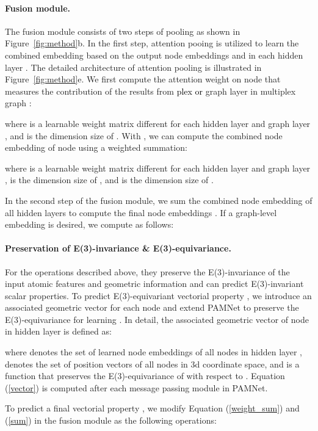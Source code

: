 \documentclass[fleqn,10pt]{wlscirep}
\newcommand{\method}{PAMNet\xspace}
\begin{document}
\paragraph{Fusion module.}
The fusion module consists of two steps of pooling as shown in Figure~\ref{fig:method}b. In the first step, attention pooing is utilized to learn the combined embedding  based on the output node embeddings  and  in each hidden layer . The detailed architecture of attention pooling is illustrated in Figure~\ref{fig:method}e. We first compute the attention weight  on node  that measures the contribution of the results from \textcolor{black}{plex or} graph layer  in multiplex graph :

where  is a learnable weight matrix different for each hidden layer  and graph layer , and  is the dimension size of . With , we can compute the combined node embedding  of node  using a weighted summation:

where  is a learnable weight matrix different for each hidden layer  and graph layer ,  is the dimension size of , and  is the dimension size of . 

In the second step of the fusion module, we sum the combined node embedding  of all hidden layers to compute the final node embeddings . If a graph-level embedding  is desired, we compute as follows: 


\paragraph{Preservation of E(3)-invariance \& E(3)-equivariance.}
For the operations described above, they preserve the E(3)-invariance of the input atomic features and geometric information and can predict E(3)-invariant scalar properties. To predict E(3)-equivariant vectorial property , we introduce an associated geometric vector  for each node  and extend \method to preserve the E(3)-equivariance for learning . In detail, the associated geometric vector  of node  in hidden layer  is defined as:

where  denotes the set of learned node embeddings of all nodes in hidden layer ,  denotes the set of position vectors of all nodes in 3d coordinate space, and  is a function that preserves the E(3)-equivariance of  with respect to . Equation (\ref{vector}) is computed after each message passing module in \method.

To predict a final vectorial property , we modify Equation (\ref{weight_sum}) and (\ref{sum}) in the fusion module as the following operations:
\end{document}
